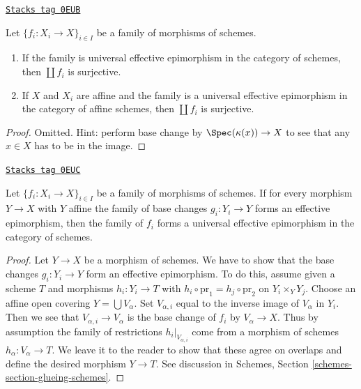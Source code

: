 \begin{lemma}
\label{descent-lemma-universal-effective-epimorphism-surjective}
\href{https://stacks.math.columbia.edu/tag/0EUB}{\texttt{Stacks tag 0EUB}}

Let $\{f_i : X_i \to X\}_{i \in I}$ be a family of morphisms of schemes.
\begin{enumerate}
\item If the family is universal effective
epimorphism in the category of schemes, then $\coprod f_i$ is surjective.
\item If $X$ and $X_i$ are affine and the family is a universal effective
epimorphism in the category of affine schemes, then
$\coprod f_i$ is surjective.
\end{enumerate}
\end{lemma}

\begin{proof}
Omitted. Hint: perform base change by $\Spec(\kappa(x)) \to X$
to see that any $x \in X$ has to be in the image.
\end{proof}

\begin{lemma}
\label{descent-lemma-check-universal-effective-epimorphism-affine}
\href{https://stacks.math.columbia.edu/tag/0EUC}{\texttt{Stacks tag 0EUC}}

Let $\{f_i : X_i \to X\}_{i \in I}$ be a family of morphisms of schemes.
If for every morphism $Y \to X$ with $Y$ affine the family of base changes
$g_i : Y_i \to Y$ forms an effective epimorphism, then
the family of $f_i$ forms a universal effective epimorphism
in the category of schemes.
\end{lemma}

\begin{proof}
Let $Y \to X$ be a morphism of schemes. We have to show that
the base changes $g_i : Y_i \to Y$ form an effective epimorphism.
To do this, assume given a scheme $T$ and morphisms $h_i : Y_i \to T$
with $h_i \circ \text{pr}_1 = h_j \circ \text{pr}_2$ on
$Y_i \times_Y Y_j$.
Choose an affine open covering $Y = \bigcup V_\alpha$.
Set $V_{\alpha, i}$ equal to the inverse image of
$V_\alpha$ in $Y_i$. Then we see that
$V_{\alpha, i}  \to V_\alpha$ is the base change of
$f_i$ by $V_\alpha \to X$. Thus by assumption
the family of restrictions $h_i|_{V_{\alpha, i}}$
come from a morphism of schemes $h_\alpha : V_\alpha \to T$.
We leave it to the reader to show that these agree
on overlaps and define the desired morphism $Y \to T$.
See discussion in Schemes, Section \ref{schemes-section-glueing-schemes}.
\end{proof}

